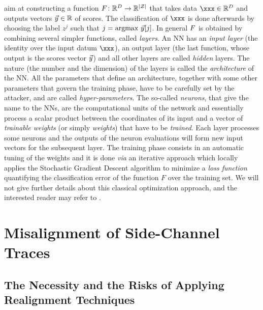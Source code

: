  aim at constructing a function $F\colon \mathbb{R}^D\rightarrow \mathbb{R}^{|\mathcal{Z}|}$ that takes data $\xxx\in \mathbb{R}^D$ and outputs vectors $\vec{y}\in \mathbb{R}$ of  scores. The classification of $\xxx$ is done afterwards by choosing the label $z^j$ such that $j = \mathrm{argmax}\ \yyy[j]$. In general $F$ is obtained by combining several simpler functions, called \emph{layers}. An NN has an \emph{input layer} (the identity over the input datum $\xxx$), an output layer (the last function, whose output is the scores vector $\vec{y}$) and all other layers are called \emph{hidden} layers. The nature (the number and the dimension) of the layers is called the \emph{architecture} of the NN. All the parameters that define an architecture, together with some other parameters that govern the training phase, have to be carefully set by the attacker, and are called \emph{hyper-parameters}. The so-called \emph{neurons}, that give the name to the NNs, are the computational units of the network and essentially process a scalar product between the coordinates of its input and a vector of  \emph{trainable weights} (or simply \emph{weights}) that have to be \emph{trained}. Each layer processes some neurons and the outputs of the neuron evaluations will form new input vectors for the subsequent layer. The training phase consists in an automatic tuning of the weights and it is done \emph{via} an iterative approach which locally applies the Stochastic Gradient Descent algorithm \cite{Goodfellow-et-al-2016} to minimize a  \emph{loss function} quantifying the classification error of the function $F$ over the training set. We will not give further details about this classical optimization approach, and the interested reader may refer to \cite{Goodfellow-et-al-2016}.\\




\section{Misalignment of Side-Channel Traces}

\subsection{The Necessity and the Risks of Applying Realignment Techniques}
